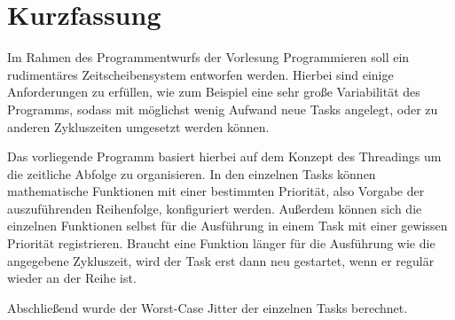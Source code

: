 \chapter*{Kurzfassung} %

Im Rahmen des Programmentwurfs der Vorlesung Programmieren soll ein rudimentäres Zeitscheibensystem entworfen werden.
Hierbei sind einige Anforderungen zu erfüllen, wie zum Beispiel eine sehr große Variabilität des Programms, sodass mit möglichst wenig Aufwand neue Tasks angelegt, oder zu anderen Zykluszeiten umgesetzt werden können. 

Das vorliegende Programm basiert hierbei auf dem Konzept des Threadings um die zeitliche Abfolge zu organisieren. 
In den einzelnen Tasks können mathematische Funktionen mit einer bestimmten Priorität, also Vorgabe der auszuführenden Reihenfolge, konfiguriert werden.
Außerdem können sich die einzelnen Funktionen selbst für die Ausführung in einem Task mit einer gewissen Priorität registrieren.
Braucht eine Funktion länger für die Ausführung wie die angegebene Zykluszeit, wird der Task erst dann neu gestartet, wenn er regulär wieder an der Reihe ist.

Abschließend wurde der Worst-Case Jitter der einzelnen Tasks berechnet.

\cleardoublepage
